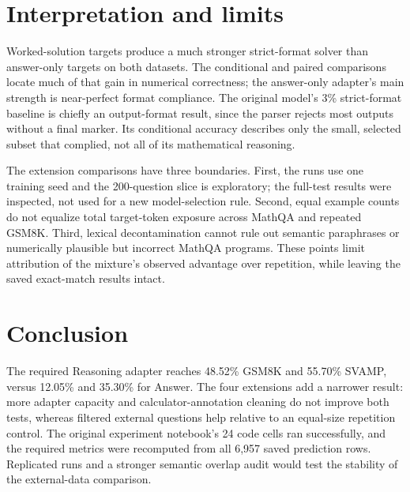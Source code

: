 \documentclass[11pt]{article}
\begin{document}
\section{Interpretation and limits}
Worked-solution targets produce a much stronger strict-format solver than answer-only targets on both datasets. The conditional and paired comparisons locate much of that gain in numerical correctness; the answer-only adapter's main strength is near-perfect format compliance. The original model's 3\% strict-format baseline is chiefly an output-format result, since the parser rejects most outputs without a final marker. Its conditional accuracy describes only the small, selected subset that complied, not all of its mathematical reasoning.

The extension comparisons have three boundaries. First, the runs use one training seed and the 200-question slice is exploratory; the full-test results were inspected, not used for a new model-selection rule. Second, equal example counts do not equalize total target-token exposure across MathQA and repeated GSM8K. Third, lexical decontamination cannot rule out semantic paraphrases or numerically plausible but incorrect MathQA programs. These points limit attribution of the mixture's observed advantage over repetition, while leaving the saved exact-match results intact.

\section{Conclusion}
The required Reasoning adapter reaches 48.52\% GSM8K and 55.70\% SVAMP, versus 12.05\% and 35.30\% for Answer. The four extensions add a narrower result: more adapter capacity and calculator-annotation cleaning do not improve both tests, whereas filtered external questions help relative to an equal-size repetition control. The original experiment notebook's 24 code cells ran successfully, and the required metrics were recomputed from all 6,957 saved prediction rows. Replicated runs and a stronger semantic overlap audit would test the stability of the external-data comparison.



\end{document}
